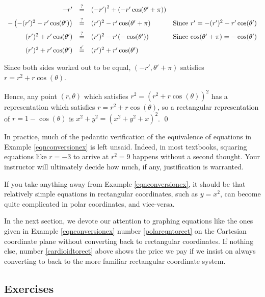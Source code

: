 \documentclass{ximera}
\begin{document}
\begin{ex}
\begin{enumerate}
\begin{enumerate}
\[\begin{array}{rclr}
-r' & \stackrel{\text{?}}{=}  & \left(-r'\right)^2 + \left(-r' \cos(\theta' + \pi)\right) & \\ [5pt]

-\left(-(r')^2 - r'\cos(\theta') \right)   & \stackrel{\text{?}}{=}  & (r')^2 - r' \cos(\theta' + \pi) & \text{Since $r' = -(r')^{2} - r'\cos(\theta')$} \\[5pt]

(r')^2 + r'\cos(\theta') & \stackrel{\text{?}}{=}  & (r')^2 - r' (- \cos(\theta')) & \text{Since $\cos(\theta' + \pi) = -\cos(\theta')$} \\[5pt]

(r')^2 + r'\cos(\theta') & \stackrel{\text{\checkmark}}{=}  & (r')^2 + r' \cos(\theta') & \\

\end{array} \]

Since both sides worked out to be equal, $(-r', \theta' + \pi)$ satisfies $r = r^2 + r\cos(\theta)$.  

\smallskip

Hence,  any point $(r,\theta)$ which satisfies $r^2 = \left(r^2 + r\cos(\theta)\right)^2$ has a representation which satisfies  $r = r^2 + r\cos(\theta)$, so a rectangular representation of $r = 1 - \cos(\theta)$ is $x^2 + y^2 = \left(x^2 + y^2 + x\right)^2$.  \qed

\end{enumerate}

\end{enumerate}

\end{ex}

In practice, much of the pedantic verification of the equivalence of equations in Example \ref{eqnconversionex} is left unsaid.  Indeed, in most textbooks, squaring equations like $r=-3$ to arrive at $r^2=9$ happens without a second thought. Your instructor will ultimately decide how much, if any, justification is warranted.

\smallskip

If you take anything away from Example \ref{eqnconversionex}, it should be that relatively simple equations in rectangular coordinates, such as $y = x^2$, can become quite complicated in polar coordinates, and vice-versa.  

\smallskip

In the next section, we devote our attention to graphing equations like the ones given in Example \ref{eqnconversionex} number \ref{polareqntorect} on the Cartesian coordinate plane without converting back to rectangular coordinates.  If nothing else, number \ref{cardioidtorect} above shows the price we pay if we insist on always converting to back to the more familiar rectangular coordinate system.

\newpage

\subsection{Exercises}




\closegraphsfile
\end{document}
